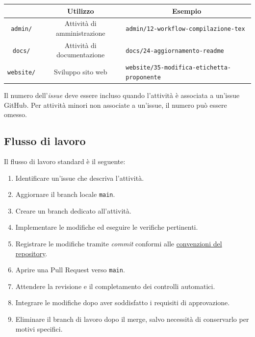 \documentclass[11pt, a4paper]{article}
\begin{document}
\begin{center}
    \renewcommand{\arraystretch}{1.5}
    \begin{tabularx}{\textwidth}{|c|c|X|}
        \hline
        \rowcolor{gray!10} 
        \multicolumn{1}{|c|}{\textbf{Tipo}} & 
        \multicolumn{1}{c|}{\textbf{Utilizzo}} & 
        \multicolumn{1}{c|}{\textbf{Esempio}} \\
        \hline
        \texttt{admin/} & Attività di amministrazione & \texttt{admin/12-workflow-compilazione-tex}\\
        \hline
        \texttt{docs/} & Attività di documentazione & \texttt{docs/24-aggiornamento-readme}\\
        \hline
        \texttt{website/} & Sviluppo sito web & \texttt{website/35-modifica-etichetta-proponente}\\
        \hline
    \end{tabularx}
\end{center}

Il numero dell'\textit{issue} deve essere incluso quando l'attività è associata a un'issue GitHub. Per attività minori non associate a un'issue, il numero può essere omesso.

\subsection{Flusso di lavoro}

Il flusso di lavoro standard è il seguente:
\begin{enumerate}
    \item Identificare un'issue che descriva l'attività.
    \item Aggiornare il branch locale \texttt{main}.
    \item Creare un branch dedicato all'attività.
    \item Implementare le modifiche ed eseguire le verifiche pertinenti.
    \item Registrare le modifiche tramite \textit{commit} conformi alle \hyperref[sec:linee-guida-per-i-commit]{convenzioni del repository}.
    \item Aprire una Pull Request verso \texttt{main}.
    \item Attendere la revisione e il completamento dei controlli automatici.
    \item Integrare le modifiche dopo aver soddisfatto i requisiti di approvazione.
    \item Eliminare il branch di lavoro dopo il merge, salvo necessità di conservarlo per motivi specifici.
\end{enumerate}
\end{document}
